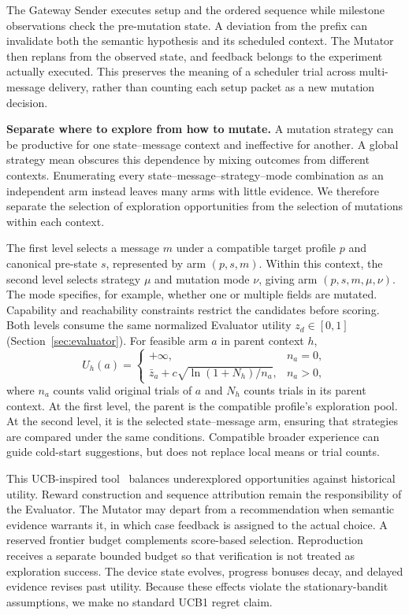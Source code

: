 \documentclass[10pt,journal,compsoc]{IEEEtran}
\newcommand{\parab}[1]{\vspace{0.04in}\noindent\textbf{#1}}
\begin{document}
The Gateway Sender executes setup and the ordered sequence while milestone observations check the pre-mutation state. A deviation from the prefix can invalidate both the semantic hypothesis and its scheduled context. The Mutator then replans from the observed state, and feedback belongs to the experiment actually executed. This preserves the meaning of a scheduler trial across multi-message delivery, rather than counting each setup packet as a new mutation decision.

\parab{Separate where to explore from how to mutate.}
A mutation strategy can be productive for one state--message context and ineffective for another. A global strategy mean obscures this dependence by mixing outcomes from different contexts. Enumerating every state--message--strategy--mode combination as an independent arm instead leaves many arms with little evidence. We therefore separate the selection of exploration opportunities from the selection of mutations within each context.

The first level selects a message $m$ under a compatible target profile $p$ and canonical pre-state $s$, represented by arm $(p,s,m)$. Within this context, the second level selects strategy $\mu$ and mutation mode $\nu$, giving arm $(p,s,m,\mu,\nu)$. The mode specifies, for example, whether one or multiple fields are mutated. Capability and reachability constraints restrict the candidates before scoring. Both levels consume the same normalized Evaluator utility $z_d\in[0,1]$ (Section~\ref{sec:evaluator}). For feasible arm $a$ in parent context $h$,
\begin{equation}
U_h(a)=
\begin{cases}
+\infty, & n_a=0,\\
\bar z_a+c\sqrt{\ln(1+N_h)/n_a}, & n_a>0,
\end{cases}
\label{eq:ucb}
\end{equation}
where $n_a$ counts valid original trials of $a$ and $N_h$ counts trials in its parent context. At the first level, the parent is the compatible profile's exploration pool. At the second level, it is the selected state--message arm, ensuring that strategies are compared under the same conditions. Compatible broader experience can guide cold-start suggestions, but does not replace local means or trial counts.

This UCB-inspired tool~\cite{ucb1} balances underexplored opportunities against historical utility. Reward construction and sequence attribution remain the responsibility of the Evaluator. The Mutator may depart from a recommendation when semantic evidence warrants it, in which case feedback is assigned to the actual choice. A reserved frontier budget complements score-based selection. Reproduction receives a separate bounded budget so that verification is not treated as exploration success. The device state evolves, progress bonuses decay, and delayed evidence revises past utility. Because these effects violate the stationary-bandit assumptions, we make no standard UCB1 regret claim.
\end{document}

